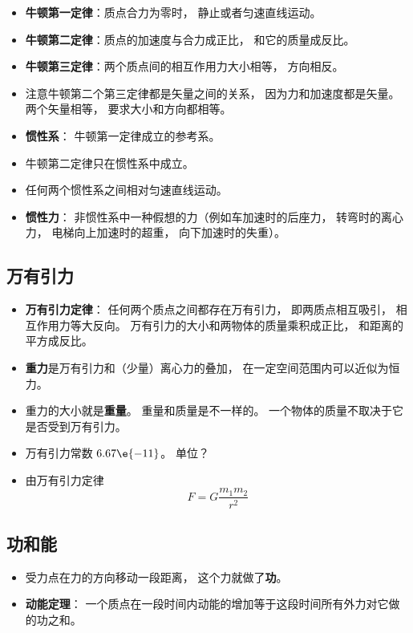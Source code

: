 \begin{itemize}
\item \textbf{牛顿第一定律}：质点合力为零时， 静止或者匀速直线运动。
\item \textbf{牛顿第二定律}：质点的加速度与合力成正比， 和它的质量成反比。
\item \textbf{牛顿第三定律}：两个质点间的相互作用力大小相等， 方向相反。
\item 注意牛顿第二个第三定律都是矢量之间的关系， 因为力和加速度都是矢量。 两个矢量相等， 要求大小和方向都相等。
\item \textbf{惯性系}： 牛顿第一定律成立的参考系。
\item 牛顿第二定律只在惯性系中成立。
\item 任何两个惯性系之间相对匀速直线运动。
\item \textbf{惯性力}： 非惯性系中一种假想的力（例如车加速时的后座力， 转弯时的离心力， 电梯向上加速时的超重， 向下加速时的失重）。
\end{itemize}

\subsection{万有引力}
\begin{itemize}
\item \textbf{万有引力定律}： 任何两个质点之间都存在万有引力， 即两质点相互吸引， 相互作用力等大反向。 万有引力的大小和两物体的质量乘积成正比， 和距离的平方成反比。
\item \textbf{重力}是万有引力和（少量）离心力的叠加， 在一定空间范围内可以近似为恒力。
\item 重力的大小就是\textbf{重量}。 重量和质量是不一样的。 一个物体的质量不取决于它是否受到万有引力。
\item 万有引力常数 $6.67\e{-11}$。 单位？
\item 由万有引力定律\begin{equation}
F=G\frac{m_{1}m_{2}}{r^{2}}
\end{equation}
\end{itemize}

\subsection{功和能}
\begin{itemize}
\item 受力点在力的方向移动一段距离， 这个力就做了\textbf{功}。
\item \textbf{动能定理}： 一个质点在一段时间内动能的增加等于这段时间所有外力对它做的功之和。
\end{itemize}
